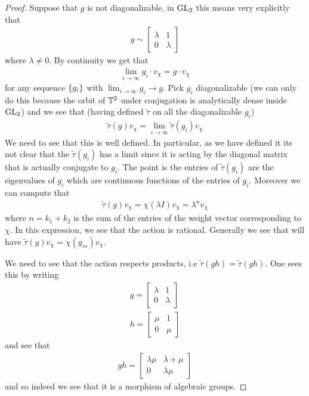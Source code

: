 \documentclass[12pt]{article}
\begin{document}
\begin{proof}
Suppose that $g$ is not diagonalizable, in $\operatorname{GL}_2$ this means very explicitly that \begin{align*}
    g\sim \begin{bmatrix}
        \lambda & 1 \\
        0 & \lambda
    \end{bmatrix}
\end{align*} where $\lambda \neq 0$.
By continuity we get that \begin{align*}
    \lim_{i\to\infty} g_i \cdot v_\chi = g\cdot v_\chi
\end{align*} for any sequence $\{g_i\}$ with $\lim_{i\to\infty}g_i\to g$.
Pick $g_i$ diagonalizable (we can only do this because the orbit of $\mathbb{T}^2$ under conjugation is analytically dense inside $\operatorname{GL}_2$) and we see that (having defined $\tilde\tau$ on all the diagonalizable $g_i$) \begin{align*}
    \tilde\tau(g)v_\chi = \lim_{i\to\infty}\tilde\tau(g_i) v_\chi
\end{align*} We need to see that this is well defined. In particular, as we have defined it its not clear that the $\tilde\tau(g_i)$ has a limit since it is acting by the diagonal matrix that is actually conjugate to $g_i$. The point is the entries of $\tilde\tau(g_i)$ are the eigenvalues of $g_i$ which are continuous functions of the entries of $g_i$. Moreover we can compute that \begin{align*}
    \tilde\tau(g)v_\chi = \chi(\lambda I)v_\chi  = \lambda^nv_\chi
\end{align*} where $n = k_1 + k_2$ is the sum of the entries of the weight vector corresponding to $\chi$. In this expression, we see that the action is rational. Generally we see that will have $\tilde\tau(g)v_\chi = \chi(g_{ss})v_\chi$. 

\hfill 

We need to see that the action respects products, i.e $\tilde\tau(gh) = \tilde\tau(gh)$. One sees this by writing \begin{align*}
    g = \begin{bmatrix}
        \lambda & 1 \\
        0 & \lambda
    \end{bmatrix} \\
    h = \begin{bmatrix}
        \mu & 1 \\
        0 & \mu
    \end{bmatrix}
\end{align*} and see that \begin{align*}
    gh = \begin{bmatrix}
        \lambda\mu & \lambda + \mu \\
        0 & \lambda\mu
    \end{bmatrix}
\end{align*} and so indeed we see that it is a morphism of algebraic groups.
\end{proof}
\end{document}
